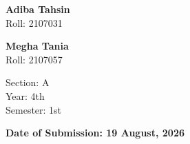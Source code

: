 \documentclass[11pt]{article}
\begin{document}
\begin{titlepage}
\begin{minipage}[t]{0.32\textwidth}
\vspace{0.45cm}
\textbf{Adiba Tahsin}\\
Roll: 2107031

\vspace{0.35cm}
\textbf{Megha Tania}\\
Roll: 2107057

\vspace{0.4cm}
Section: A\\
Year: 4th\\
Semester: 1st
\end{minipage}

\vfill

{\large\bfseries Date of Submission: 19 August, 2026}

\vspace*{0.5cm}
\end{titlepage}
\end{document}
